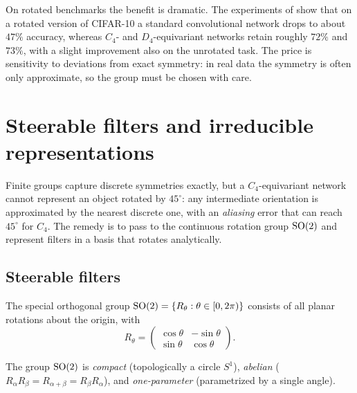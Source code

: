 On rotated benchmarks the benefit is dramatic. The experiments of
\citet{cohen2016group} show that on a rotated version of CIFAR-10 a standard
convolutional network drops to about $47\%$ accuracy, whereas $C_4$- and
$D_4$-equivariant networks retain roughly $72\%$ and $73\%$, with a slight
improvement also on the unrotated task. The price is sensitivity to deviations
from exact symmetry: in real data the symmetry is often only approximate, so the
group must be chosen with care.

\section{Steerable filters and irreducible representations}
\label{sec:groups:steerable}

Finite groups capture discrete symmetries exactly, but a $C_4$-equivariant
network cannot represent an object rotated by $45^\circ$: any intermediate
orientation is approximated by the nearest discrete one, with an
\emph{aliasing} error that can reach $45^\circ$ for $C_4$. The remedy is to pass
to the continuous rotation group $\SO(2)$ and represent filters in a basis that
rotates analytically.

\subsection{Steerable filters}
\label{sec:groups:steerable-filters}

\begin{definition}
\label{def:groups:so2}
The special orthogonal group $\operatorname{SO}(2) = \{R_\theta : \theta \in [0, 2\pi)\}$
consists of all planar rotations about the origin, with
\begin{equation}
  R_\theta = \begin{pmatrix} \cos\theta & -\sin\theta \\
                             \sin\theta & \cos\theta \end{pmatrix}.
\end{equation}
\end{definition}

\begin{proposition}[Properties of $\SO(2)$]
\label{prop:groups:so2-properties}
The group $\SO(2)$ is \emph{compact} (topologically a circle $S^1$),
\emph{abelian} ($R_\alpha R_\beta = R_{\alpha+\beta} = R_\beta R_\alpha$), and
\emph{one-parameter} (parametrized by a single angle).
\end{proposition}

